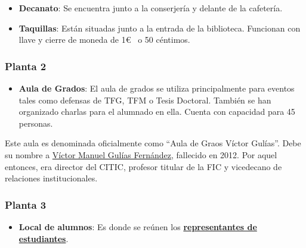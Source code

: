 \begin{itemize}

    \item \textbf{Decanato}: Se encuentra junto a la conserjería y delante de la cafetería. 

    \item \textbf{Taquillas}: Están situadas junto a la entrada de la biblioteca. Funcionan con llave y cierre de moneda de 1\euro~ o 50 céntimos.
    
\end{itemize}

\subsubsection{Planta 2}

\begin{itemize}
    \item \textbf{Aula de Grados}: El aula de grados se utiliza principalmente para eventos tales como defensas de \acrshort{TFG}, \acrshort{TFM} o Tesis Doctoral. También se han organizado charlas para el alumnado en ella. Cuenta con capacidad para 45 personas. 
\end{itemize}

\begin{curiosityBox}
    Este aula es denominada oficialmente como “Aula de Graos Víctor Gulías”. Debe su nombre a \href{https://badalnovas.com/2024/01/28/in-memoriam-victor-manuel-gulias-fernandez-10o-aniversario-do-seu-falecemento/}{Víctor Manuel Gulías Fernández}, fallecido en 2012. Por aquel entonces, era director del \acrshort{CITIC}, profesor titular de la \acrshort{FIC} y vicedecano de relaciones institucionales.   
\end{curiosityBox}

\subsubsection{Planta 3}

\begin{itemize}
    \item \textbf{Local de alumnos}: Es donde se reúnen los \href{https://www.fic.udc.es/gl/delegacion-e-asociacions}{\textbf{representantes de estudiantes}}.
\end{itemize}
